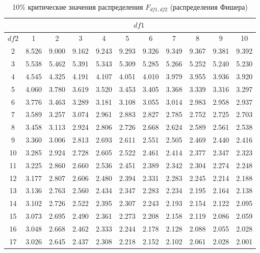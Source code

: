 \documentclass[12pt]{article}
\begin{document}
\begin{table}
\caption{10\% критические значения распределения $F_{df1,df2}$
(распределения Фишера) }
\begin{center}
{\footnotesize
\begin{tabular}{|c|c|c|c|c|c|c|c|c|c|c|}
	\hline
	& \multicolumn{10}{c|}{$df1$} \\ \hline
	$df2$ &   1&   2&   3&   4&   5&   6&   7&   8&   9&   10\\ \hline \hline
	2 &  8.526 &  9.000 &  9.162 &  9.243 &  9.293&9.326& 9.349 &9.367 &  9.381 &  9.392\\
	3 &  5.538 &  5.462 &  5.391&5.343& 5.309& 5.285& 5.266 &  5.252 &  5.240 &  5.230\\
	4 &  4.545&4.325& 4.191 &4.107 &4.051 &4.010 &  3.979 &  3.955 &  3.936&3.920\\
	5 &4.060 &3.780 &3.619 &3.520 &3.453 &  3.405 &  3.368 &  3.339&3.316 &3.297 \\
	6 &3.776 &3.463 &3.289& 3.181 &  3.108 &  3.055 &3.014 &2.983 &2.958&2.937 \\
	7 &3.589 &3.257 &3.074& 2.961 &2.883& 2.827 &2.785 &2.752 &2.725&2.703 \\
	8 &3.458 &3.113 &2.924 &2.806 & 2.726 &2.668 &2.624 &  2.589 &2.561&2.538\\
	9 &3.360 &3.006 &2.813 & 2.693 &2.611 &2.551 &  2.505 &2.469 &2.440&2.416\\
	10 &3.285 &2.924 &2.728 &2.605 &2.522 & 2.461 &2.414 &2.377 &2.347&2.323\\
	11 &3.225 &2.860 &2.660 &2.536 &2.451 & 2.389 &2.342 &2.304 &2.274&2.248\\
	12& 3.177& 2.807 &2.606 &  2.480 &2.394& 2.331 &  2.283 &2.245 &2.214&2.188\\
	13& 3.136& 2.763 &2.560 &  2.434 &2.347 &  2.283& 2.234 &2.195 &2.164&2.138 \\
	14 &3.102& 2.726& 2.522 &2.395 &  2.307& 2.243 &2.193 &2.154& 2.122&2.095 \\
	15& 3.073& 2.695& 2.490 &  2.361& 2.273& 2.208&   2.158& 2.119&2.086& 2.059 \\
	16& 3.048 &2.668 &2.462 &2.333 &2.244& 2.178 &2.128 &2.088 &2.055&2.028\\
	17& 3.026& 2.645 &2.437 &2.308 &  2.218& 2.152& 2.102& 2.061& 2.028&2.001\\

\end{tabular}}
\end{center}
\end{table}
\end{document}
